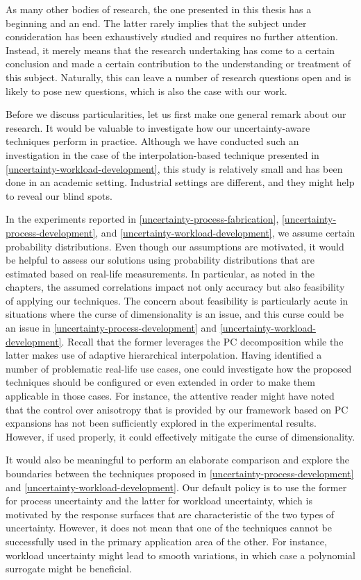 As many other bodies of research, the one presented in this thesis has a
beginning and an end. The latter rarely implies that the subject under
consideration has been exhaustively studied and requires no further attention.
Instead, it merely means that the research undertaking has come to a certain
conclusion and made a certain contribution to the understanding or treatment of
this subject. Naturally, this can leave a number of research questions open and
is likely to pose new questions, which is also the case with our work.

Before we discuss particularities, let us first make one general remark about
our research. It would be valuable to investigate how our uncertainty-aware
techniques perform in practice. Although we have conducted such an investigation
in the case of the interpolation-based technique presented in
\cref{uncertainty-workload-development}, this study is relatively small and has
been done in an academic setting. Industrial settings are different, and they
might help to reveal our blind spots.

In the experiments reported in \cref{uncertainty-process-fabrication},
\cref{uncertainty-process-development}, and
\cref{uncertainty-workload-development}, we assume certain probability
distributions. Even though our assumptions are motivated, it would be helpful to
assess our solutions using probability distributions that are estimated based on
real-life measurements. In particular, as noted in the chapters, the assumed
correlations impact not only accuracy but also feasibility of applying our
techniques. The concern about feasibility is particularly acute in situations
where the curse of dimensionality is an issue, and this curse could be an issue
in \cref{uncertainty-process-development} and
\cref{uncertainty-workload-development}. Recall that the former leverages the
\ac{PC} decomposition while the latter makes use of adaptive hierarchical
interpolation. Having identified a number of problematic real-life use cases,
one could investigate how the proposed techniques should be configured or even
extended in order to make them applicable in those cases. For instance, the
attentive reader might have noted that the control over anisotropy that is
provided by our framework based on \ac{PC} expansions has not been sufficiently
explored in the experimental results. However, if used properly, it could
effectively mitigate the curse of dimensionality.

It would also be meaningful to perform an elaborate comparison and explore the
boundaries between the techniques proposed in
\cref{uncertainty-process-development} and
\cref{uncertainty-workload-development}. Our default policy is to use the former
for process uncertainty and the latter for workload uncertainty, which is
motivated by the response surfaces that are characteristic of the two types of
uncertainty. However, it does not mean that one of the techniques cannot be
successfully used in the primary application area of the other. For instance,
workload uncertainty might lead to smooth variations, in which case a polynomial
surrogate might be beneficial.

